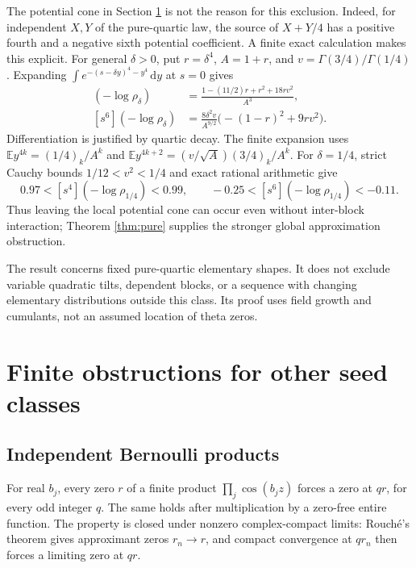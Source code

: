 \documentclass[11pt]{article}
\theoremstyle{remark}
\newcommand{\E}{\mathbb E}
\newcommand{\dd}{\,\mathrm d}
\numberwithin{equation}{section}
\begin{document}
The potential cone in Section \ref{sec:finite} is not the reason for this
exclusion. Indeed, for independent \(X,Y\) of the pure-quartic law,
the source of \(X+Y/4\) has a positive fourth and a negative sixth
potential coefficient. A finite exact calculation makes this explicit.
For general \(\delta>0\), put \(r=\delta^4\), \(A=1+r\), and
\(v=\Gamma(3/4)/\Gamma(1/4)\). Expanding
\(\int e^{-(s-\delta y)^4-y^4}\dd y\) at \(s=0\) gives
\begin{align*}
 [s^4](-\log\rho_\delta)
  &=\frac{1-(11/2)r+r^2+18rv^2}{A^3},\\
 [s^6](-\log\rho_\delta)
  &=\frac{8\delta^2v}{A^{9/2}}
       \bigl(-(1-r)^2+9rv^2\bigr).
\end{align*}
Differentiation is justified by quartic decay. The finite expansion uses
\(\E y^{4k}=(1/4)_k/A^k\) and
\(\E y^{4k+2}=(v/\sqrt A)(3/4)_k/A^k\).
For \(\delta=1/4\), strict Cauchy bounds \(1/12<v^2<1/4\) and exact
rational arithmetic \cite{records} give
\[
 0.97<[s^4](-\log\rho_{1/4})<0.99,\qquad
 -0.25<[s^6](-\log\rho_{1/4})<-0.11.
\]
Thus leaving the local potential cone can occur even without
inter-block interaction; Theorem \ref{thm:pure} supplies the stronger
global approximation obstruction.

The result concerns fixed pure-quartic elementary shapes. It does not
exclude variable quadratic tilts, dependent blocks, or a sequence with
changing elementary distributions outside this class. Its proof uses
field growth and cumulants, not an assumed location of theta zeros.

\section{Finite obstructions for other seed classes}\label{sec:finite}

\subsection{Independent Bernoulli products}
For real \(b_j\), every zero \(r\) of a finite product
\(\prod_j\cos(b_jz)\) forces a zero at \(qr\), for every odd integer \(q\).
The same holds after multiplication by a zero-free entire function.
The property is closed under nonzero complex-compact limits: Rouch\'e's
theorem gives approximant zeros \(r_n\to r\), and compact convergence at
\(qr_n\) then forces a limiting zero at \(qr\).
\end{document}
